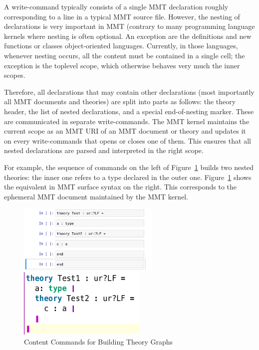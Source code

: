 A write-command typically consists of a single MMT declaration roughly corresponding to a line in a typical MMT source file.
However, the nesting of declarations is very important in MMT (contrary to many programming language kernels where nesting is often optional. An exception are the definitions and new functions or classes  object-oriented languages. Currently, in those languages, whenever nesting occurs, all the content must be contained in a single cell; the exception is the toplevel scope, which otherwise behaves very much the inner scopes.%

Therefore, all declarations that may contain other declarations (most importantly all MMT documents and theories) are split into parts as follows: the theory header, the list of nested declarations, and a special end-of-nesting marker. These are communicated in separate write-commands.
The MMT kernel maintains the current scope as an MMT URI of an MMT document or theory and updates it on every write-commands that opens or closes one of them.
This ensures that all nested declarations are parsed and interpreted in the right scope.

For example, the sequence of commands on the left of Figure~\ref{fig:test_theory} builds two nested theories: the inner one refers to a type declared in the outer one. Figure~\ref{fig:test_theory} shows the equivalent in MMT surface syntax on the right. This corresponds to the ephemeral MMT document maintained by the MMT kernel.
\begin{figure}[ht]\centering
\begin{minipage}[c]{6.8cm}\includegraphics[width=6.8cm]{test_theory_jupyter}\end{minipage}
\begin{minipage}[c]{6.1cm}\includegraphics[width=6.1cm]{test_theory}\end{minipage}
\caption{Content Commands for Building Theory Graphs}\label{fig:test_theory}
\end{figure}

